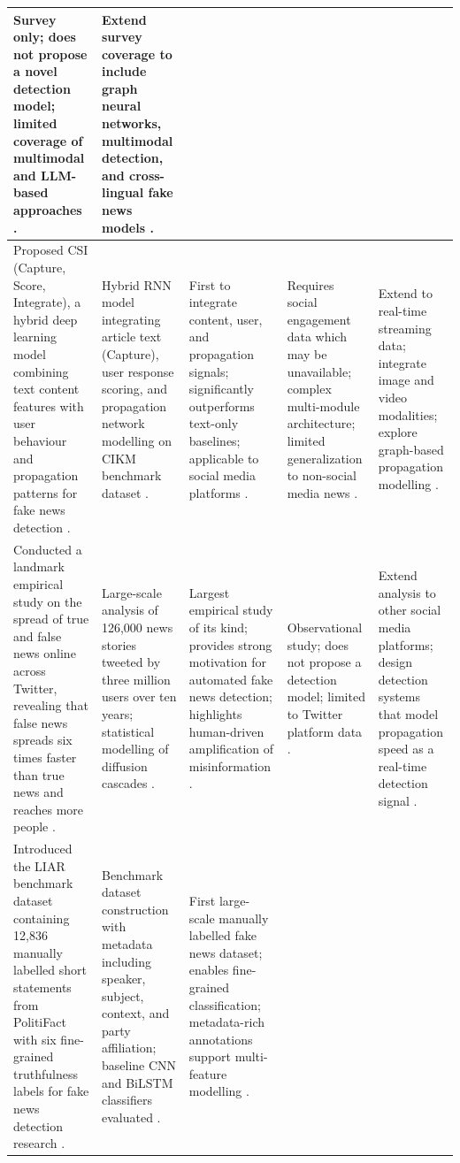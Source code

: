 \documentclass[runningheads]{llncs}
\begin{document}
\begin{longtable}{|p{}|p{}|p{}|p{}|p{}|}
Survey only; does not propose a novel detection model; limited coverage of multimodal and LLM-based approaches \cite{Zhou2020Survey}. &
Extend survey coverage to include graph neural networks, multimodal detection, and cross-lingual fake news models \cite{Zhou2020Survey}. \\ \hline
Proposed CSI (Capture, Score, Integrate), a hybrid deep learning model combining text content features with user behaviour and propagation patterns for fake news detection \cite{Ruchansky2017CSI}. &
Hybrid RNN model integrating article text (Capture), user response scoring, and propagation network modelling on CIKM benchmark dataset \cite{Ruchansky2017CSI}. &
First to integrate content, user, and propagation signals; significantly outperforms text-only baselines; applicable to social media platforms \cite{Ruchansky2017CSI}. &
Requires social engagement data which may be unavailable; complex multi-module architecture; limited generalization to non-social media news \cite{Ruchansky2017CSI}. &
Extend to real-time streaming data; integrate image and video modalities; explore graph-based propagation modelling \cite{Ruchansky2017CSI}. \\ \hline
Conducted a landmark empirical study on the spread of true and false news online across Twitter, revealing that false news spreads six times faster than true news and reaches more people \cite{Vosoughi2018Spread}. &
Large-scale analysis of 126,000 news stories tweeted by three million users over ten years; statistical modelling of diffusion cascades \cite{Vosoughi2018Spread}. &
Largest empirical study of its kind; provides strong motivation for automated fake news detection; highlights human-driven amplification of misinformation \cite{Vosoughi2018Spread}. &
Observational study; does not propose a detection model; limited to Twitter platform data \cite{Vosoughi2018Spread}. &
Extend analysis to other social media platforms; design detection systems that model propagation speed as a real-time detection signal \cite{Vosoughi2018Spread}. \\ \hline
Introduced the LIAR benchmark dataset containing 12,836 manually labelled short statements from PolitiFact with six fine-grained truthfulness labels for fake news detection research \cite{Wang2017Liar}. &
Benchmark dataset construction with metadata including speaker, subject, context, and party affiliation; baseline CNN and BiLSTM classifiers evaluated \cite{Wang2017Liar}. &
First large-scale manually labelled fake news dataset; enables fine-grained classification; metadata-rich annotations support multi-feature modelling \cite{Wang2017Liar}. &

\end{longtable}
\end{document}
